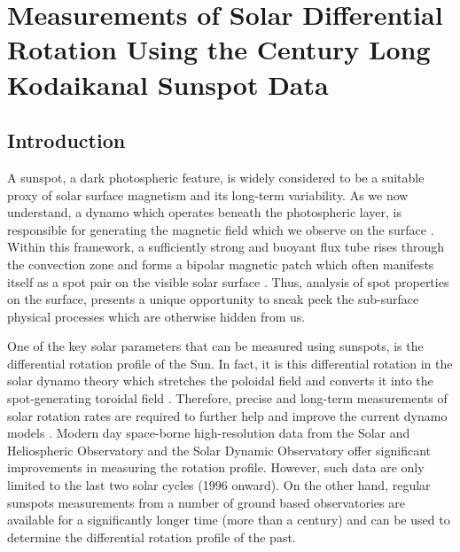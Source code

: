 \chapter[Differential Rotation of the Sun Using KoSO Data]{Measurements of Solar Differential Rotation Using the Century Long Kodaikanal Sunspot Data}
\label{Chap4}
\noindent
\section{Introduction}
\label{ch4-intro}
A sunspot, a dark photospheric feature, is widely considered to be a suitable proxy of solar surface magnetism and its long-term variability. As we now understand, a dynamo which operates beneath the photospheric layer, is responsible for generating the magnetic field which we observe on the surface \citep{Parker1955a}. Within this framework, a sufficiently strong and buoyant flux tube rises through the convection zone and forms a bipolar magnetic patch which often manifests itself as a spot pair on the visible solar surface \citep{Parker1955a, Solanki2003}. Thus, analysis of spot properties on the surface, presents a unique opportunity to sneak peek the sub-surface physical processes which are otherwise hidden from us. 

One of the key solar parameters that can be measured using sunspots, is the differential rotation profile of the Sun. In fact, it is this differential rotation in the solar dynamo theory which stretches the poloidal field and converts it into the spot-generating toroidal field \citep{Charbonneau2010}. Therefore, precise and long-term measurements of solar rotation rates are required to further help and improve the current dynamo models \citep{Badalyan2017}. Modern day space-borne high-resolution data from the Solar and Heliospheric Observatory \citep[SOHO:][]{Domingo1995} and the Solar Dynamic Observatory \citep[SDO:][]{Pesnell2012} offer significant improvements in measuring the rotation profile. However, such data are only limited to the last two solar cycles (1996 onward). On the other hand, regular sunspots measurements from a number of ground based observatories are available for a significantly longer time (more than a century) and can be used to determine the differential rotation profile of the past.


